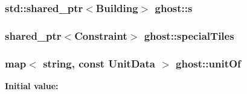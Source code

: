 \hypertarget{namespaceghost_a21eab9fd4ae07c7db20e824cc4452a97}{
\subsubsection[{s}]{\setlength{\rightskip}{0pt plus 5cm}std\-::shared\-\_\-ptr$<${\bf Building}$>$ ghost\-::s}}\label{namespaceghost_a21eab9fd4ae07c7db20e824cc4452a97}
\hypertarget{namespaceghost_a41140633099e7f2158ce39ca3a469abb}{
\subsubsection[{special\-Tiles}]{\setlength{\rightskip}{0pt plus 5cm}shared\-\_\-ptr$<${\bf Constraint}$>$ ghost\-::special\-Tiles}}\label{namespaceghost_a41140633099e7f2158ce39ca3a469abb}
\hypertarget{namespaceghost_ab5bef690341741098adffdc2a214a5aa}{
\subsubsection[{unit\-Of}]{\setlength{\rightskip}{0pt plus 5cm}map$<$ string, const {\bf Unit\-Data} $>$ ghost\-::unit\-Of}}\label{namespaceghost_ab5bef690341741098adffdc2a214a5aa}
{\bfseries Initial value\-:}
